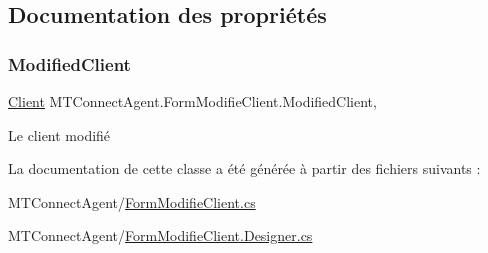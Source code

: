 \subsection{Documentation des propriétés}
\mbox{\label{class_m_t_connect_agent_1_1_form_modifie_client_a8f2c248d245052d915c92a991ce11e75}} 
\subsubsection{\texorpdfstring{Modified\+Client}{ModifiedClient}}
{\footnotesize\ttfamily \mbox{\hyperlink{class_m_t_connect_agent_1_1_model_1_1_client}{Client}} M\+T\+Connect\+Agent.\+Form\+Modifie\+Client.\+Modified\+Client\hspace{0.3cm}{\ttfamily [get]}, {\ttfamily [set]}}



Le client modifié 



La documentation de cette classe a été générée à partir des fichiers suivants \+:\begin{DoxyCompactItemize}
\item 
M\+T\+Connect\+Agent/\mbox{\hyperlink{_form_modifie_client_8cs}{Form\+Modifie\+Client.\+cs}}\item 
M\+T\+Connect\+Agent/\mbox{\hyperlink{_form_modifie_client_8_designer_8cs}{Form\+Modifie\+Client.\+Designer.\+cs}}\end{DoxyCompactItemize}
